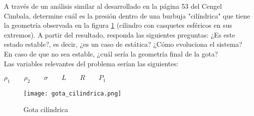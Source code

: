 \item A través de un análisis similar al desarrollado en la página 53 del
Cengel Cimbala, determine cuál es la presión dentro de una burbuja "cilíndrica" que tiene la geometría observada en la figura \ref{fig:gotaCilindrica} (cilindro con casquetes esféricos en sus extremos).
A partir del resultado, responda las siguientes preguntas:
¿Es este estado estable?, es decir, ¿es un caso de estática?
¿Cómo evoluciona el sistema? En caso de que no sea estable,
¿cuál sería la geometría final de la gota?
\\
Las variables relevantes del problema serían las siguientes:
\begin{center}
  $\rho_1 \qquad \rho_2 \qquad \sigma \qquad L \qquad R  \qquad P_{1}$
\end{center}

\begin{figure}[h!!!!]
  \centering
  \texttt{[image: gota\_cilindrica.png]}
  \caption{Gota cilíndrica}
  \label{fig:gotaCilindrica}
\end{figure}
